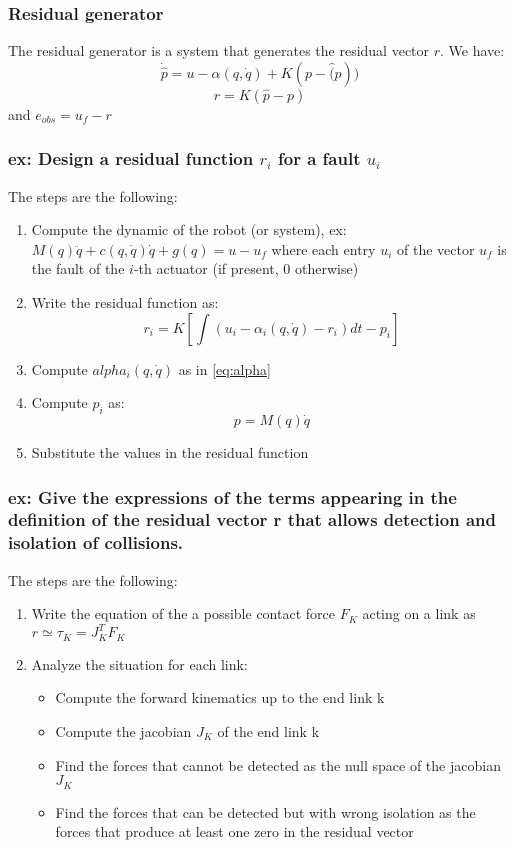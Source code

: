 \documentclass[a4paper,12pt]{article}
\begin{document}
\subsubsection{Residual generator}
The residual generator is a system that generates the residual vector $r$.
We have:
\begin{equation}
\dot{\hat{p}}=u - \alpha(q,\dot{q}) + K(p- \hat(p))
\end{equation}
\begin{equation}
    r=K(\hat{p}-p)
\end{equation}
and $e_{obs}=u_f - r$

\subsubsection{ex: Design a residual function $r_i$ for a fault $u_i$}
The steps are the following:
\begin{enumerate}
    \item Compute the dynamic of the robot (or system), ex: 
    $M(q)\ddot{q}+c(q,\dot{q})\dot{q}+g(q)=u - u_f$
    where each entry $u_i$ of the vector $u_f$ is the fault
    of the $i$-th actuator (if present, 0 otherwise)
    \item Write the residual function as: \begin{equation}
    r_i=K[\int(u_i-\alpha_i(q,\dot{q})-r_i)dt-p_i]
    \end{equation}
    \item Compute $alpha_i(q,\dot{q})$ as in \ref{eq:alpha}
    \item Compute $p_i$ as: \begin{equation}
    p=M(q)\dot{q}
    \end{equation}
    \item Substitute the values in the residual function
\end{enumerate}

\subsubsection{ex: Give the
 expressions of the terms appearing in the 
 definition of the residual vector r 
that allows detection and isolation of collisions.
}
The steps are the following:
\begin{enumerate}
    \item Write the equation of the a possible 
    contact force $F_K$ acting on a link as 
    $r \simeq \tau_K=J_K^TF_K$
    \item Analyze the situation for each link:
    \begin{itemize}
        \item Compute the forward kinematics up to the end link k 
        \item Compute the jacobian $J_K$ of the end link k
        \item Find the forces that cannot be detected 
        as the null space of the jacobian $J_K$
        \item Find the forces that can be detected but 
        with wrong isolation as the forces that produce 
        at least one zero in the residual vector
    \end{itemize}
\end{enumerate}
\end{document}
